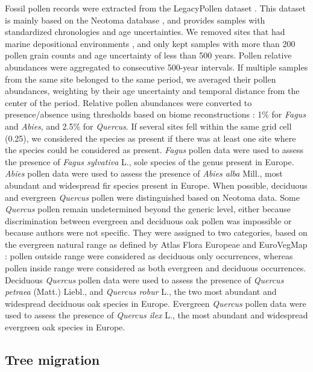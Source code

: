 \documentclass[pdflatex, sn-nature]{sn-jnl}%
\begin{document}
Fossil pollen records were extracted from the LegacyPollen dataset \cite{Herzschuh2022}. This dataset is mainly based on the Neotoma database \cite{Williams2018}, and provides samples with standardized chronologies and age uncertainties. We removed sites that had marine depositional environments \cite{Maguire2016}, and only kept samples with more than 200 pollen grain counts and age uncertainty of less than 500 years.
Pollen relative abundances were aggregated to consecutive 500-year intervals. If multiple samples from the same site belonged to the same period, we averaged their pollen abundances, weighting by their age uncertainty and temporal distance from the center of the period. Relative pollen abundances were converted to presence/absence using thresholds based on biome reconstructions \cite{Williams1998}: 1\% for \emph{Fagus} and \emph{Abies}, and 2.5\% for \emph{Quercus}. If several sites fell within the same grid cell (0.25\degree), we considered the species as present if there was at least one site where the species could be considered as present. \textit{Fagus} pollen data were used to assess the presence of \textit{Fagus sylvativa} L., sole species of the genus present in Europe. \textit{Abies} pollen data were used to assess the presence of \textit{Abies alba} Mill., most abundant and widespread fir species present in Europe. When possible, deciduous and evergreen \textit{Quercus} pollen were distinguished based on Neotoma data. Some \textit{Quercus} pollen remain undetermined beyond the generic level, either because discrimination between evergreen and deciduous oak pollen was impossible or because authors were not specific. They were assigned to two categories, based on the evergreen natural range as defined by Atlas Flora Europeae \cite{AFE2005} and EuroVegMap \cite{EVM2003}: pollen outside range were considered as deciduous only occurrences, whereas pollen inside range were considered as both evergreen and deciduous occurrences. Deciduous \textit{Quercus} pollen data were used to assess the presence of \textit{Quercus} \textit{petraea}  (Matt.) Liebl., and \textit{Quercus robur} L., the two most abundant and widespread deciduous oak species in Europe. Evergreen \textit{Quercus} pollen data were used to assess the presence of \textit{Quercus ilex} L., the most abundant and widespread evergreen oak species in Europe.

\subsection{Tree migration}\label{migration}
\end{document}
